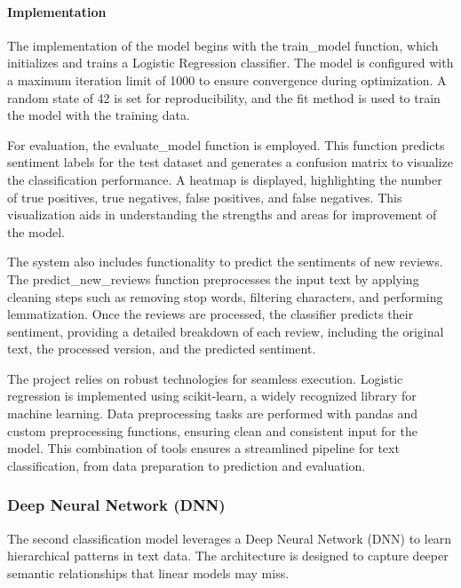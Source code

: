 \documentclass{article}
\begin{document}
\paragraph{Implementation}
The implementation of the model begins with the train\_model function, which initializes and trains a Logistic Regression classifier. The model is configured with a maximum iteration limit of 1000 to ensure convergence during optimization. A random state of 42 is set for reproducibility, and the fit method is used to train the model with the training data.

For evaluation, the evaluate\_model function is employed. This function predicts sentiment labels for the test dataset and generates a confusion matrix to visualize the classification performance. A heatmap is displayed, highlighting the number of true positives, true negatives, false positives, and false negatives. This visualization aids in understanding the strengths and areas for improvement of the model.

The system also includes functionality to predict the sentiments of new reviews. The predict\_new\_reviews function preprocesses the input text by applying cleaning steps such as removing stop words, filtering characters, and performing lemmatization. Once the reviews are processed, the classifier predicts their sentiment, providing a detailed breakdown of each review, including the original text, the processed version, and the predicted sentiment.

The project relies on robust technologies for seamless execution. Logistic regression is implemented using scikit-learn, a widely recognized library for machine learning. Data preprocessing tasks are performed with pandas and custom preprocessing functions, ensuring clean and consistent input for the model. This combination of tools ensures a streamlined pipeline for text classification, from data preparation to prediction and evaluation.

\subsubsection{Deep Neural Network (DNN)}
The second classification model leverages a Deep Neural Network (DNN) to learn hierarchical patterns in text data. The architecture is designed to capture deeper semantic relationships that linear models may miss.
\end{document}

